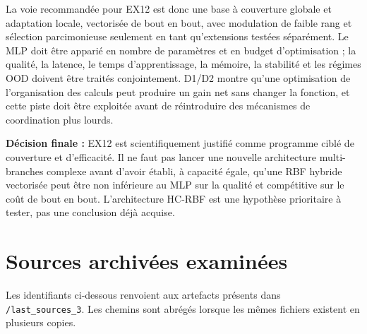 \documentclass[11pt,a4paper]{article}
\newcommand{\HC}{\textsc{HC-RBF}}
\newcommand{\code}[1]{\texttt{\small #1}}
\begin{document}
La voie recommandée pour EX12 est donc une base à couverture globale et adaptation locale, vectorisée de bout en bout, avec modulation de faible rang et sélection parcimonieuse seulement en tant qu'extensions testées séparément. Le MLP doit être apparié en nombre de paramètres et en budget d'optimisation ; la qualité, la latence, le temps d'apprentissage, la mémoire, la stabilité et les régimes OOD doivent être traités conjointement. D1/D2 montre qu'une optimisation de l'organisation des calculs peut produire un gain net sans changer la fonction, et cette piste doit être exploitée avant de réintroduire des mécanismes de coordination plus lourds.

\textbf{Décision finale :} EX12 est scientifiquement justifié comme programme ciblé de couverture et d'efficacité. Il ne faut pas lancer une nouvelle architecture multi-branches complexe avant d'avoir établi, à capacité égale, qu'une RBF hybride vectorisée peut être non inférieure au MLP sur la qualité et compétitive sur le coût de bout en bout. L'architecture \HC{} est une hypothèse prioritaire à tester, pas une conclusion déjà acquise.

\newpage
\appendix
\section{Sources archivées examinées}

Les identifiants ci-dessous renvoient aux artefacts présents dans \code{/\allowbreak{}last\_\allowbreak{}sources\_\allowbreak{}3}. Les chemins sont abrégés lorsque les mêmes fichiers existent en plusieurs copies.
\end{document}
